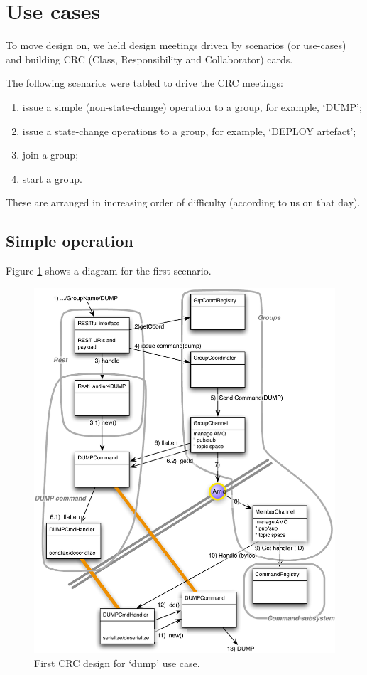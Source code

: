 \documentclass[a4paper,12pt]{article}
\begin{document}
\section{Use cases}
To move design on, we held design meetings driven by scenarios (or use-cases) and building CRC (Class, Responsibility and Collaborator) cards.

The following scenarios were tabled to drive the CRC meetings:
\begin{enumerate}
\item issue a simple (non-state-change) operation to a group, for example, `DUMP';
\item issue a state-change operations to a group, for example, `DEPLOY artefact';
\item join a group;
\item start a group.
\end{enumerate}

These are arranged in increasing order of difficulty (according to us on that day).

\subsection{Simple operation}
Figure \ref{fig:groupdesign001} shows a diagram for the first scenario.
\begin{figure}[h]
\centering
\includegraphics*[scale=0.6]{GroupDesign001.pdf}
\caption{First CRC design for `dump' use case.}
\label{fig:groupdesign001}
\end{figure}
\end{document}
